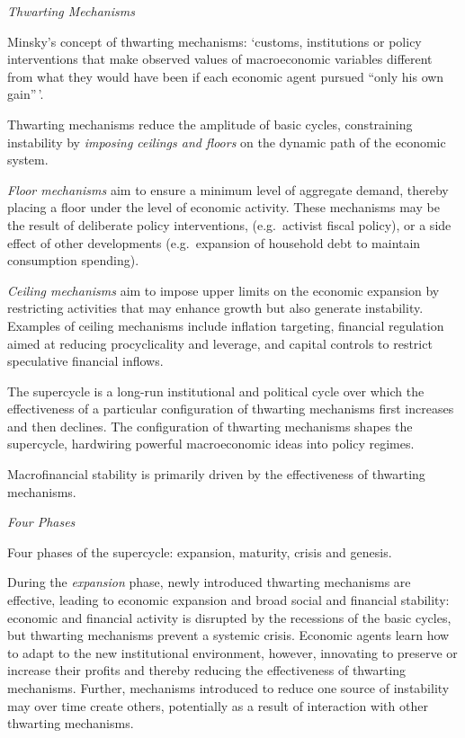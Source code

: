 \documentclass[
]{book}
\begin{document}
\emph{Thwarting Mechanisms}

Minsky's concept of thwarting mechanisms:
`customs, institutions or policy interventions that make observed values of
macroeconomic variables different from what they would have been
if each economic agent pursued ``only his own gain''\,'.

Thwarting mechanisms reduce the amplitude of basic cycles,
constraining instability by \emph{imposing ceilings and floors} on the dynamic path of the
economic system.

\emph{Floor mechanisms} aim to ensure a minimum level of aggregate demand,
thereby placing a floor under the level of economic activity. These
mechanisms may be the result of deliberate policy interventions,
(e.g.~activist fiscal policy), or a side effect of other developments
(e.g.~expansion of household debt to maintain consumption spending).

\emph{Ceiling mechanisms} aim to impose upper limits on the economic expansion by restricting
activities that may enhance growth but also generate instability.
Examples of ceiling mechanisms include inflation targeting,
financial regulation aimed at reducing procyclicality and leverage, and
capital controls to restrict speculative financial inflows.

The supercycle is a long-run institutional and political cycle
over which the effectiveness of a particular configuration of thwarting mechanisms
first increases and then declines.
The configuration of thwarting mechanisms shapes the supercycle,
hardwiring powerful macroeconomic ideas into policy regimes.

Macrofinancial stability is primarily driven by the
effectiveness of thwarting mechanisms.

\emph{Four Phases}

Four phases of the supercycle: expansion, maturity, crisis and genesis.

During the \emph{expansion} phase, newly introduced thwarting
mechanisms are effective, leading to economic expansion and broad social and financial stability:
economic and financial activity is disrupted by the recessions of the basic cycles, but thwarting
mechanisms prevent a systemic crisis.
Economic agents learn how to adapt to the new institutional environment, however, innovating to
preserve or increase their profits and thereby reducing the effectiveness of thwarting mechanisms.
Further, mechanisms introduced to reduce one source of instability may over time create others,
potentially as a result of interaction with other thwarting mechanisms.
\end{document}
